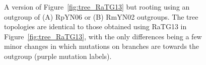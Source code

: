 \documentclass[9pt,twocolumn,twoside]{gsajnl_modified}
\begin{document}
\begin{figure}[h!]
{ }
 \caption{
 A version of Figure~\ref{fig:tree_RaTG13} but rooting using an outgroup of (A) RpYN06 or (B) RmYN02 outgroups.
 The tree topologies are identical to those obtained using RaTG13 in Figure~\ref{fig:tree_RaTG13}, with the only differences being a few minor changes in which mutations on branches are towards the outgroup (purple mutation labels).
\label{suppfig:tree_RpYN06_RmYN02}
 }
 \end{figure}
\end{document}

